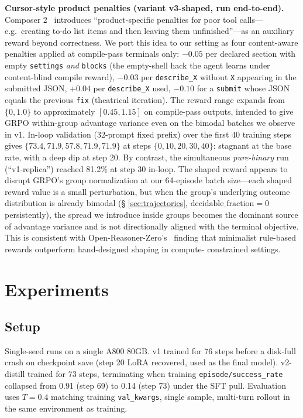 \documentclass[10pt]{article}
\begin{document}
\textbf{Cursor-style product penalties (variant v3-shaped, run end-to-end).}
Composer 2~\cite{cursor2025composer2} introduces ``product-specific
penalties for poor tool calls---e.g.\ creating to-do list items and
then leaving them unfinished''---as an auxiliary reward beyond
correctness. We port this idea to our setting as four
content-aware penalties applied at compile-pass terminals only:
$-0.05$ per declared section with empty \texttt{settings} \emph{and}
\texttt{blocks} (the empty-shell hack the agent learns under
content-blind compile reward), $-0.03$ per \texttt{describe\_X}
without \texttt{X} appearing in the submitted JSON, $+0.04$ per
\texttt{describe\_X} used, $-0.10$ for a \texttt{submit} whose JSON
equals the previous \texttt{fix} (theatrical iteration).
The reward range expands from $\{0, 1.0\}$ to approximately
$[0.45, 1.15]$ on compile-pass outputs, intended to give GRPO
within-group advantage variance even on the bimodal batches we
observe in v1. In-loop validation (32-prompt fixed prefix) over the
first 40 training steps gives $\{73.4, 71.9, 57.8, 71.9, 71.9\}$ at
steps $\{0, 10, 20, 30, 40\}$: stagnant at the base rate, with a deep
dip at step 20. By contrast, the simultaneous \emph{pure-binary} run
(``v1-replica'') reached 81.2\% at step 30 in-loop. The shaped reward
appears to disrupt GRPO's group normalization at our 64-episode batch
size---each shaped reward value is a small perturbation, but when the
group's underlying outcome distribution is already bimodal (\S
\ref{sec:trajectories}, $\mathrm{decidable\_fraction}=0$ persistently),
the spread we introduce inside groups becomes the dominant source of
advantage variance and is not directionally aligned with the terminal
objective. This is consistent with
Open-Reasoner-Zero's~\cite{hu2025orz} finding that minimalist
rule-based rewards outperform hand-designed shaping in compute-
constrained settings.

\section{Experiments}
\label{sec:exp}

\subsection{Setup}
Single-seed runs on a single A800 80GB. v1 trained for 76 steps before a
disk-full crash on checkpoint save (step 20 LoRA recovered, used as the
final model). v2-distill trained for 73 steps, terminating when training
\texttt{episode/success\_rate} collapsed from 0.91 (step 69) to 0.14 (step 73)
under the SFT pull. Evaluation uses $T=0.4$ matching training
\texttt{val\_kwargs}, single sample, multi-turn rollout in the same
environment as training.
\end{document}

